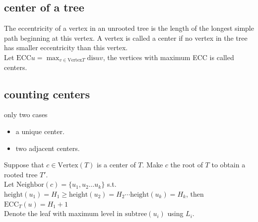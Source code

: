 \documentclass{article}
\begin{document}
\newcommand{\ECC}{\mathrm{ECC}}
\newcommand{\V}{\mathrm{Vertex}}
\newcommand{\N}{\mathrm{Neighbor}}
\newcommand{\dis}{\mathrm{dis}}
\newcommand{\subtree}{\mathrm{subtree}}
\newcommand{\height}{\mathrm{height}}

\subsection{center of a tree}


The eccentricity of a vertex in an unrooted tree is the length of the longest simple path beginning at this vertex.
A vertex is called a center if no vertex in the tree has smaller eccentricity than this vertex.\\
Let $\ECC{u}=\max_{v\in \V{T}}\dis{u}{v}$, the vertices with maximum ECC is called centers.

\subsection{counting centers}
only two cases
\begin{itemize}
	\item a unique center.
	\item two adjacent centers.
\end{itemize}

Suppose that $c\in \V(T)$ is a center of $T$.
Make $c$ the root of $T$ to obtain a rooted tree $T'$.\\
Let $\N(c)=\{u_1,u_2\ldots u_k\}$
s.t. $\height (u_1)=H_1\geq \height (u_2)=H_2\cdots \height (u_k)=H_k$,
then $\ECC_T(u)=H_1+1$\\
Denote the leaf with maximum level in $\subtree(u_i)$ using $L_i$.
\end{document}
